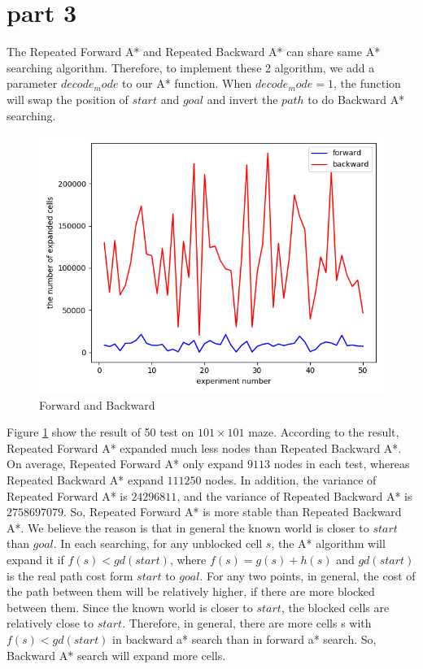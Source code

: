 \documentclass[11pt]{article}
\begin{document}
\section*{part 3}
The Repeated Forward A* and Repeated Backward A* can share same A* searching algorithm. Therefore, to implement these 2 algorithm, we add a parameter $decode_mode$ to our A* function. When $decode_mode = 1$, the function will swap the position of $start$ and $goal$ and invert the $path$ to do Backward A* searching.
	\begin{figure}[htb]
		\centering
		\includegraphics[scale = 0.3]{forward_backward.png}
		\caption{Forward and Backward}
		\label{fig:Fig3.F&B}
	\end{figure}
\newline
Figure \ref{fig:Fig3.F&B} show the result of 50 test on $101\times 101$ maze. According to the  result, Repeated Forward A* expanded much less  nodes than Repeated Backward A*. On average, Repeated Forward A* only expand $9113$ nodes in each test, whereas Repeated Backward A* expand $111250$ nodes. In addition, the variance of Repeated Forward A* is $24296811$, and the variance of Repeated Backward A* is $2758697079$. So, Repeated Forward A* is more stable than Repeated Backward A*.
\newline
We believe the reason is that in general the known world is closer to $start$ than $goal$. In each searching, for any unblocked cell $s$, the A* algorithm will expand it if $f(s) < gd(start)$, where $f(s) = g(s) + h(s)$ and $gd(start)$ is the real path cost form $start$ to $goal$. For any two points, in general, the cost of the path between them will be relatively higher, if there are more blocked between them. Since the known world is closer to $start$, the blocked cells are relatively close to $start$. Therefore, in general, there are more cells s with $f(s) < gd(start)$ in backward a* search than in forward a* search. So, Backward A* search will expand more cells.
\end{document}
